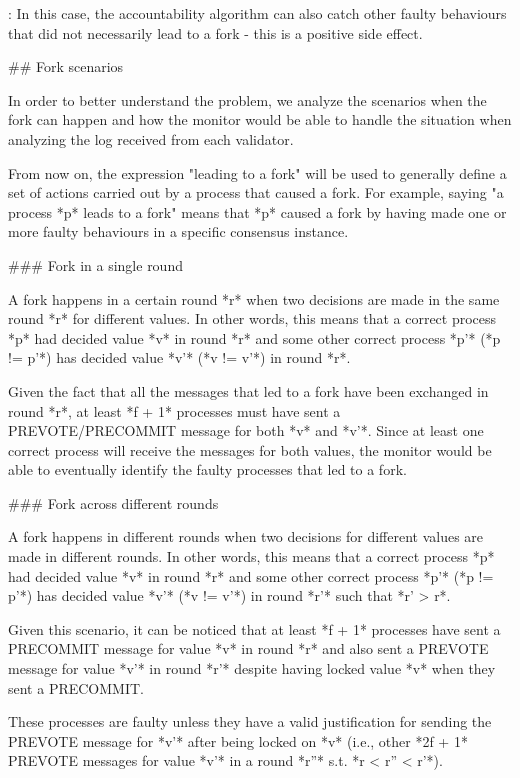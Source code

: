 \documentclass[a4paper,11pt,oneside]{report}
\begin{document}
\begin{markdown}
[^2]: In this case, the accountability algorithm can also catch other faulty behaviours that did not necessarily lead to a fork - this is a positive side effect.

## Fork scenarios

In order to better understand the problem, we analyze the scenarios when the fork can happen and how the monitor would be able to handle the situation when analyzing the log received from each validator.

From now on, the expression "leading to a fork" will be used to generally define a set of actions carried out by a process that caused a fork. 
For example, saying "a process *p* leads to a fork" means that *p* caused a fork by having made one or more faulty behaviours in a specific consensus instance.

### Fork in a single round

A fork happens in a certain round *r* when two decisions are made in the same round *r* for different values.
In other words, this means that a correct process *p* had decided value *v* in round *r* and some other correct process *p'* (*p != p'*) has decided value *v'* (*v != v'*) in round *r*. 

Given the fact that all the messages that led to a fork have been exchanged in round *r*, at least *f + 1* processes must have sent a PREVOTE/PRECOMMIT message for both *v* and *v'*.
Since at least one correct process will receive the messages for both values, the monitor would be able to eventually identify the faulty processes that led to a fork.  

### Fork across different rounds

A fork happens in different rounds when two decisions for different values are made in different rounds. 
In other words, this means that a correct process *p* had decided value *v* in round *r* and some other correct process *p'* (*p != p'*) has decided value *v'* (*v != v'*) in round *r'* such that *r' > r*. 

Given this scenario, it can be noticed that at least *f + 1* processes have sent a PRECOMMIT message for value *v* in round *r* and also sent a PREVOTE message for value *v'* in round *r'* despite having locked value *v* when they sent a PRECOMMIT.

These processes are faulty unless they have a valid justification for sending the PREVOTE message for *v'* after being locked on *v* (i.e., other *2f + 1* PREVOTE messages for value *v'* in a round *r''* s.t. *r < r'' < r'*).
 

\end{markdown}
\end{document}
